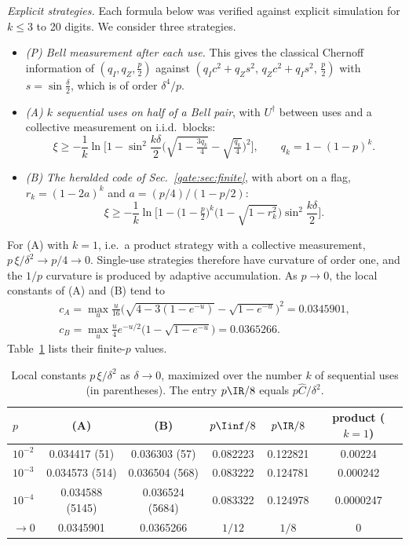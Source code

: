 \emph{Explicit strategies.} Each formula below was verified against explicit simulation for $k\le3$ to 20 digits. We consider three strategies.
\begin{itemize}
\item \emph{(P) Bell measurement after each use.} This gives the classical Chernoff information of $(q_I,q_Z,\frac p2)$ against $(q_Ic^2+q_Zs^2,\,q_Zc^2+q_Is^2,\,\frac p2)$ with $s=\sin\frac\delta2$, which is of order $\delta^4/p$.
\item \emph{(A) $k$ sequential uses on half of a Bell pair}, with $U^\dagger$ between uses and a collective measurement on i.i.d.\ blocks:
\begin{equation}
\xi\ge-\frac1k\ln\Big[1-\sin^2\frac{k\delta}{2}\Big(\sqrt{1-\tfrac{3q_k}{4}}-\sqrt{\tfrac{q_k}{4}}\Big)^2\Big],\qquad q_k=1-(1-p)^k .
\end{equation}
\item \emph{(B) The heralded code of Sec.~\ref{gate:sec:finite}}, with abort on a flag, $r_k=(1-2a)^k$ and $a=(p/4)/(1-p/2)$:
\begin{equation}
\xi\ge-\frac1k\ln\Big[1-\big(1-\tfrac p2\big)^k\big(1-\sqrt{1-r_k^2}\big)\sin^2\frac{k\delta}{2}\Big].
\end{equation}
\end{itemize}
For (A) with $k=1$, i.e.\ a product strategy with a collective measurement, $p\,\xi/\delta^2\to p/4\to0$. Single-use strategies therefore have curvature of order one, and the $1/p$ curvature is produced by adaptive accumulation. As $p\to0$, the local constants of (A) and (B) tend to
\begin{equation}
\begin{gathered}
c_A=\max_u\frac u{16}\Big(\sqrt{4-3(1-e^{-u})}-\sqrt{1-e^{-u}}\Big)^2=0.0345901,\\
c_B=\max_u\frac u4e^{-u/2}\Big(1-\sqrt{1-e^{-u}}\Big)=0.0365266 .
\end{gathered}
\end{equation}
Table~\ref{gate:tab:m1local} lists their finite-$p$ values.

\begin{table}[!tbp]
\centering
\caption{Local constants $p\,\xi/\delta^2$ as $\delta\to0$, maximized over the number $k$ of sequential uses (in parentheses). The entry $p\IR/8$ equals $p\hat C/\delta^2$.}
\label{gate:tab:m1local}
\begin{tabular}{lccccc}
\toprule
$p$ & (A) & (B) & $p\Iinf/8$ & $p\IR/8$ & product ($k=1$)\\
\midrule
$10^{-2}$ & 0.034417 (51) & 0.036303 (57) & 0.082223 & 0.122821 & 0.00224\\
$10^{-3}$ & 0.034573 (514) & 0.036504 (568) & 0.083222 & 0.124781 & 0.000242\\
$10^{-4}$ & 0.034588 (5145) & 0.036524 (5684) & 0.083322 & 0.124978 & 0.0000247\\
$\to0$ & 0.0345901 & 0.0365266 & $1/12$ & $1/8$ & 0\\
\bottomrule
\end{tabular}
\end{table}

